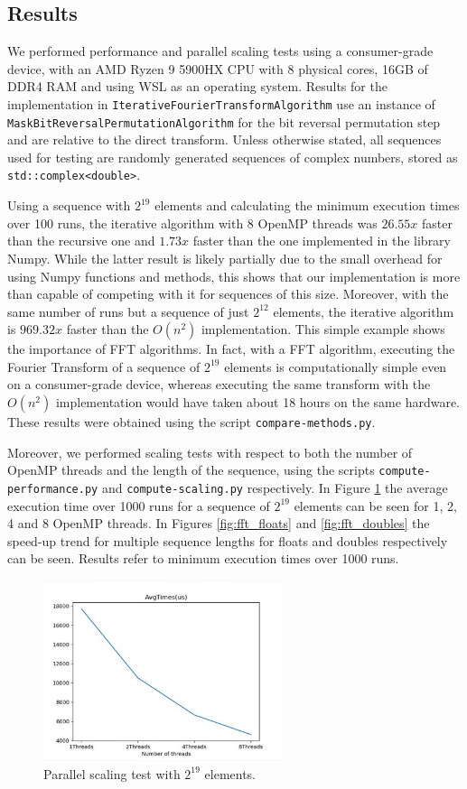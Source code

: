 \subsection{Results}
We performed performance and parallel scaling tests using a consumer-grade device, with an AMD Ryzen 9 5900HX CPU with 8 physical cores, 16GB of DDR4 RAM and using WSL as an operating system. Results for the implementation in \texttt{Iterative\-Fourier\-Transform\-Algorithm} use an instance of \texttt{Mask\-Bit\-Reversal\-Permutation\-Algorithm} for the bit reversal permutation step and are relative to the direct transform. Unless otherwise stated, all sequences used for testing are randomly generated sequences of complex numbers, stored as \texttt{std::complex<double>}.

Using a sequence with $2^{19}$ elements and calculating the minimum execution times over 100 runs, the iterative algorithm with 8 OpenMP threads was $26.55x$ faster than the recursive one and $1.73x$ faster than the one implemented in the library Numpy. While the latter result is likely partially due to the small overhead for using Numpy functions and methods, this shows that our implementation is more than capable of competing with it for sequences of this size. Moreover, with the same number of runs but a sequence of just $2^{12}$ elements, the iterative algorithm is $969.32x$ faster than the $O(n^2)$ implementation. This simple example shows the importance of FFT algorithms. In fact, with a FFT algorithm, executing the Fourier Transform of a sequence of $2^{19}$ elements is computationally simple even on a consumer-grade device, whereas executing the same transform with the $O(n^2)$ implementation would have taken about 18 hours on the same hardware. These results were obtained using the script \texttt{compare-methods.py}.

Moreover, we performed scaling tests with respect to both the number of OpenMP threads and the length of the sequence, using the scripts \texttt{compute\--performance.py} and \texttt{compute\--scaling.py} respectively. In Figure \ref{fig:fft_threads} the average execution time over 1000 runs for a sequence of $2^{19}$ elements can be seen for 1, 2, 4 and 8 OpenMP threads. In Figures \ref{fig:fft_floats} and \ref{fig:fft_doubles} the speed-up trend for multiple sequence lengths for floats and doubles respectively can be seen. Results refer to minimum execution times over 1000 runs.

\begin{figure}[ht]
    \centering
    \includegraphics[width=70mm]{image/fft_times}
    \caption{Parallel scaling test with $2^{19}$ elements.}
    \label{fig:fft_threads}
\end{figure}

